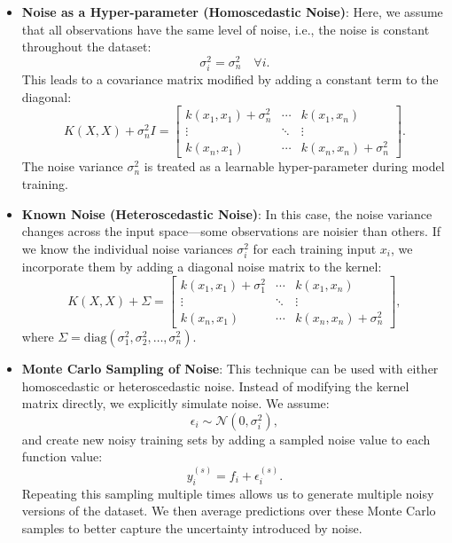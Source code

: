 \documentclass{article}
\begin{document}
\begin{itemize}
    \item \textbf{Noise as a Hyper-parameter (Homoscedastic Noise)}:  
    Here, we assume that all observations have the same level of noise, i.e., the noise is constant throughout the dataset:
    \[
    \sigma_i^2 = \sigma_n^2 \quad \forall i.
    \]
    This leads to a covariance matrix modified by adding a constant term to the diagonal:
    \[
    K(X, X) + \sigma_n^2 I = 
    \begin{bmatrix}
    k(x_1, x_1) + \sigma_n^2 & \cdots & k(x_1, x_n) \\
    \vdots & \ddots & \vdots \\
    k(x_n, x_1) & \cdots & k(x_n, x_n) + \sigma_n^2
    \end{bmatrix}.
    \]
    The noise variance $\sigma_n^2$ is treated as a learnable hyper-parameter during model training.

    \item \textbf{Known Noise (Heteroscedastic Noise)}:  
    In this case, the noise variance changes across the input space—some observations are noisier than others. If we know the individual noise variances $\sigma_i^2$ for each training input $x_i$, we incorporate them by adding a diagonal noise matrix to the kernel:
    \[
    K(X, X) + \Sigma = 
    \begin{bmatrix}
    k(x_1, x_1) + \sigma_1^2 & \cdots & k(x_1, x_n) \\
    \vdots & \ddots & \vdots \\
    k(x_n, x_1) & \cdots & k(x_n, x_n) + \sigma_n^2
    \end{bmatrix},
    \]
    where $\Sigma = \text{diag}(\sigma_1^2, \sigma_2^2, \dots, \sigma_n^2)$.

    \item \textbf{Monte Carlo Sampling of Noise}:  
    This technique can be used with either homoscedastic or heteroscedastic noise. Instead of modifying the kernel matrix directly, we explicitly simulate noise. We assume:
    \[
    \epsilon_i \sim \mathcal{N}(0, \sigma_i^2),
    \]
    and create new noisy training sets by adding a sampled noise value to each function value:
    \[
    y_i^{(s)} = f_i + \epsilon_i^{(s)}.
    \]
    Repeating this sampling multiple times allows us to generate multiple noisy versions of the dataset. We then average predictions over these Monte Carlo samples to better capture the uncertainty introduced by noise.
\end{itemize}
\end{document}
